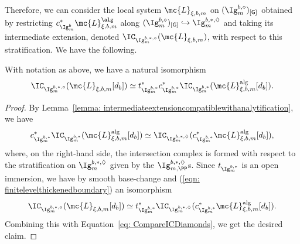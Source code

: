 \documentclass[letterpaper,11pt]{amsart}
\begin{document}
Therefore, we can consider the local system $\mc{L}_{\xi,b,m}$ on $(\Ig^{b,\diamond}_{m})_{[\mathsf{G}]}$ obtained by restricting $c_{\Ig^b_m}^\ast \mc{L}^{\alg}_{\xi,b,m}$ along $(\Ig^{b,\diamond}_{m})_{[\mathsf{G}]}\hookrightarrow \Ig_{m}^{b,\ast, \Diamond}$ and taking its intermediate extension, denoted $\IC_{\Ig_{m}^{b,\ast,\diamond}}(\mc{L}_{\xi,b,m})$, with respect to this stratification. We have the following.
\begin{lemma}\label{lem: diamondICviaAnalytification}
With notation as above, we have a natural isomorphism
    \[\IC_{\Ig_{m}^{b,\ast,\diamond}}(\mc{L}_{\xi,b,m}[d_{b}])\simeq t_{\Ig_{m}^{b,\ast}}^\ast c_{\Ig_{m}^{b,\ast}}^\ast \IC_{\Ig^{b,\ast}_{m}}(\mc{L}_{\xi,b,m}^\mathrm{alg}[d_{b}]).\]
\end{lemma}
\begin{proof}
    By Lemma~\ref{lemma: intermediateextensioncompatiblewithanalytification}, we have  
    \begin{equation}\label{eq: CompareICDiamonds}
        c_{\Ig_{m}^{b,\ast}}^\ast \IC_{\Ig^{b,\ast}_{m}}(\mc{L}_{\xi,b,m}^\mathrm{alg}[d_{b}])\simeq  \IC_{\Ig^{b,\ast,\Diamond}_{m}}(c_{\Ig_{m}^{b,\ast}}^\ast\mc{L}_{\xi,b,m}^\mathrm{alg}[d_{b}]),
    \end{equation}
    where, on the right-hand side, the intersection complex is formed with respect to the stratification on $\Ig^{b,\ast,\Diamond}_{m}$ given by the $\Ig^{b,\ast,\Diamond}_{m,\PP}$s. Since $t_{\Ig_m^{b,\ast}}$ is an open immersion, we have by smooth base-change and (\ref{eqn: finitelevelthickenedboundary}) an isomorphism
    \[\IC_{\Ig_{m}^{b,\ast,\diamond}}(\mc{L}_{\xi,b,m}[d_{b}])\simeq t_{\Ig_m^{b,\ast}}^\ast\IC_{\Ig^{b,\ast,\Diamond}_m}(c_{\Ig_{m}^{b,\ast}}^\ast\mc{L}_{\xi,b,m}^\mathrm{alg}[d_{b}]).\]
    Combining this with Equation~\eqref{eq: CompareICDiamonds}, we get the desired claim.
\end{proof}
\end{document}
